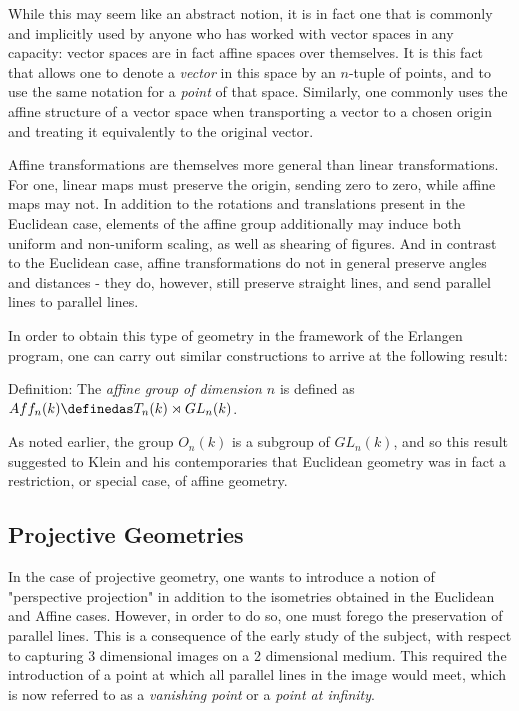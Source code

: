 \documentclass[]{article}
\begin{document}
While this may seem like an abstract notion, it is in fact one that is
commonly and implicitly used by anyone who has worked with vector spaces
in any capacity: vector spaces are in fact affine spaces over
themselves. It is this fact that allows one to denote a \emph{vector} in
this space by an \(n\)-tuple of points, and to use the same notation for
a \emph{point} of that space. Similarly, one commonly uses the affine
structure of a vector space when transporting a vector to a chosen
origin and treating it equivalently to the original vector.

Affine transformations are themselves more general than linear
transformations. For one, linear maps must preserve the origin, sending
zero to zero, while affine maps may not. In addition to the rotations
and translations present in the Euclidean case, elements of the affine
group additionally may induce both uniform and non-uniform scaling, as
well as shearing of figures. And in contrast to the Euclidean case,
affine transformations do not in general preserve angles and distances -
they do, however, still preserve straight lines, and send parallel lines
to parallel lines.

In order to obtain this type of geometry in the framework of the
Erlangen program, one can carry out similar constructions to arrive at
the following result:

Definition: The \emph{affine group of dimension \(n\)} is defined as
\(Aff_n(k) \definedas T_n(k) \rtimes GL_n(k)\).

As noted earlier, the group \(O_n(k)\) is a subgroup of \(GL_n(k)\), and
so this result suggested to Klein and his contemporaries that Euclidean
geometry was in fact a restriction, or special case, of affine geometry.

\subsection{Projective Geometries}\label{header-n85}

In the case of projective geometry, one wants to introduce a notion of
"perspective projection" in addition to the isometries obtained in the
Euclidean and Affine cases. However, in order to do so, one must forego
the preservation of parallel lines. This is a consequence of the early
study of the subject, with respect to capturing 3 dimensional images on
a 2 dimensional medium. This required the introduction of a point at
which all parallel lines in the image would meet, which is now referred
to as a \emph{vanishing point} or a \emph{point at infinity}.
\end{document}
